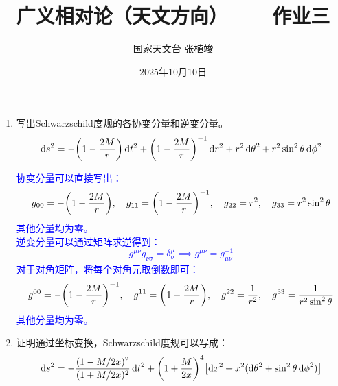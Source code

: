 \documentclass[a4paper]{article}
\title{\textbf{广义相对论（天文方向）\ \ \ \ 作业三}}
\author{国家天文台 张植竣}
\date{2025年10月10日}
\begin{document}
\maketitle

\begin{enumerate}
    \item 写出Schwarzschild度规的各协变分量和逆变分量。
    \[
        \dd{s}^2 = -\qty(1 - \frac{2M}{r}) \dd{t}^2 + \qty(1 - \frac{2M}{r})^{-1} \dd{r}^2 + r^2 \dd{\theta}^2 + r^2 \sin^2\theta \dd{\phi}^2
    \]

    \textcolor{blue}{
    协变分量可以直接写出：
    \[
        g_{00} = -\qty(1 - \frac{2M}{r}),\quad g_{11} = \qty(1 - \frac{2M}{r})^{-1},\quad g_{22} = r^2,\quad g_{33} = r^2 \sin^2\theta
    \]
    其他分量均为零。 \\
    逆变分量可以通过矩阵求逆得到：
    \[
        g^{\mu\nu} g_{\nu\sigma} = \delta^\mu_\sigma \implies g^{\mu\nu} = g_{\mu\nu}^{-1}
    \]
    对于对角矩阵，将每个对角元取倒数即可：
    \[
        g^{00} = -\qty(1 - \frac{2M}{r})^{-1},\quad g^{11} = \qty(1 - \frac{2M}{r}),\quad g^{22} = \frac{1}{r^2},\quad g^{33} = \frac{1}{r^2 \sin^2\theta}
    \]
    其他分量均为零。
    }

    \item 证明通过坐标变换，Schwarzschild度规可以写成：
    \[
        \dd{s}^2 = -\frac{(1 - M/2x)^2}{(1 + M/2x)^2} \dd{t}^2 + \qty(1 + \frac{M}{2x})^4 \qty[\dd{x}^2 + x^2 (\dd{\theta}^2 + \sin^2\theta \dd{\phi}^2)]
    \]


\end{enumerate}
\end{document}

